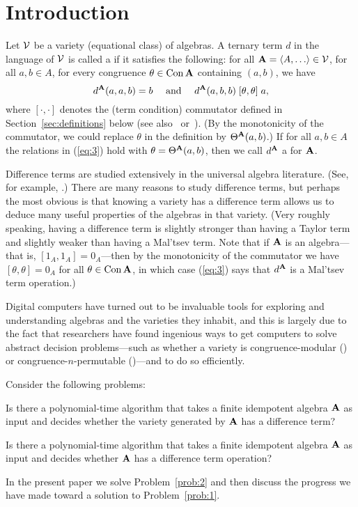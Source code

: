 

\section{Introduction}
\label{sec:introduction}
Let $\mathcal{V}$ be a variety (equational class) of algebras.
A ternary term $d$ in the language of $\mathcal{V}$ is called 
a  if it satisfies the following:
for all $\bA = \<A, \dots \> \in \sV$, for all $a, b \in A$, for every 
congruence $\theta\in \operatorname{Con}\mathbf{A}$ containing $(a,b)$, we have
\begin{equation}
\label{eq:3}  
d^{\mathbf{A}}(a,a,b) = b \quad \text{ and } \quad
d^{\mathbf{A}}(a,b,b) \mathrel{[\theta, \theta]} a,
\end{equation}
where $[\cdot, \cdot]$ denotes the (term condition) commutator
defined in Section~\ref{sec:definitions} below
(see also~\cite{HM:1988} or~\cite{MR3076179}).
(By the monotonicity of the commutator, we could replace $\theta$ in the
definition by $\Theta^{\mathbf{A}}(a,b)$.)
If for all $a, b \in A$ the relations in (\ref{eq:3}) hold 
with $\theta = \Theta^{\mathbf{A}}(a,b)$, then we call
$d^{\mathbf{A}}$ a  for $\mathbf{A}$.

Difference terms are studied extensively in the universal algebra literature.
(See, for example, \cite{HM:1988,KSW,MR3449235,MR1358491,MR3076179,MR1663558}.)
There are many reasons to study difference terms, but
perhaps the most obvious is that knowing a variety 
has a difference term allows us to deduce many useful
properties of the algebras in that variety.
(Very roughly speaking, having a difference term is slightly stronger than having
a Taylor term and slightly weaker than having a Mal'tsev term.
Note that if
$\mathbf{A}$ is an  algebra---that is, $[1_A, 1_A] = 0_A$---then by
the monotonicity of the commutator we have
$[\theta, \theta] = 0_A$ for all $\theta \in \operatorname{Con} \mathbf{A}$, in which case
(\ref{eq:3}) says that $d^{\mathbf{A}}$ is a Mal'tsev term operation.)

Digital computers have turned out to be invaluable tools for exploring and
understanding algebras and the varieties they inhabit, and this is largely due
to the fact that researchers have found ingenious ways
to get computers to solve abstract decision problems---such as
whether a variety is 
congruence-modular (\cite{Freese:2009}) or
congruence-$n$-permutable (\cite{MR3239624})---and to do so efficiently.

Consider the following problems:
\begin{prob}
  \label{prob:1}
  Is there a polynomial-time algorithm that takes a finite
  idempotent algebra $\mathbf{A}$ as input and decides whether the variety generated by
  $\mathbf{A}$ has a difference term?
\end{prob}
\begin{prob}
  \label{prob:2}
  Is there a polynomial-time algorithm that takes a finite
  idempotent algebra $\mathbf{A}$ as input and decides whether 
  $\mathbf{A}$ has a difference term operation?
\end{prob}
In the present paper we solve Problem~\ref{prob:2} and then discuss the
progress we have made toward a solution to Problem~\ref{prob:1}. 

